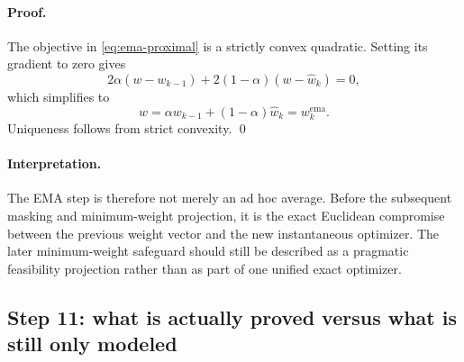 \paragraph{Proof.}
The objective in \eqref{eq:ema-proximal} is a strictly convex quadratic. Setting its gradient to zero gives
\begin{equation}
2\alpha(w-w_{k-1}) + 2(1-\alpha)(w-\hat w_k)=0,
\end{equation}
which simplifies to
\begin{equation}
w=\alpha w_{k-1} + (1-\alpha)\hat w_k = w_k^{\mathrm{ema}}.
\end{equation}
Uniqueness follows from strict convexity. \qed

\paragraph{Interpretation.}
The EMA step is therefore not merely an ad hoc average. Before the subsequent masking and minimum-weight projection, it is the exact Euclidean compromise between the previous weight vector and the new instantaneous optimizer. The later minimum-weight safeguard should still be described as a pragmatic feasibility projection rather than as part of one unified exact optimizer.

\subsection*{Step 11: what is actually proved versus what is still only modeled}

